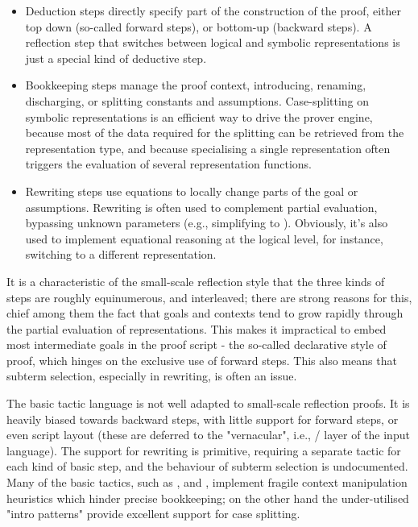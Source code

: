 \begin{itemize}
\item Deduction steps directly specify part of the construction of
the proof, either top down (so-called forward steps), or bottom-up
(backward steps). A reflection step that switches between logical and
symbolic representations is just a special kind of deductive step.
\item
Bookkeeping steps manage the proof context, introducing, renaming,
discharging, or splitting constants and assumptions. Case-splitting on
symbolic representations is an efficient way to drive the prover
engine, because most of the data required for the splitting can be
retrieved from the representation type, and because specialising a
single representation often triggers the evaluation of several
representation functions.
\item Rewriting steps use equations to locally
change parts of the goal or assumptions.  Rewriting is often used to
complement partial evaluation, bypassing unknown parameters (e.g.,
simplifying  to ). Obviously, it's also used to
implement equational reasoning at the logical level, for instance,
switching to a different representation.
\end{itemize}

It is a characteristic of the
small-scale reflection style that the three kinds of steps are roughly
equinumerous, and interleaved; there are strong reasons for this,
chief among them the fact that goals and contexts tend to grow rapidly
through the partial evaluation of representations.  This makes it
impractical to embed most intermediate goals in the proof script - the
so-called declarative style of proof, which hinges on the exclusive
use of forward steps. This also means that subterm selection,
especially in rewriting, is often an issue.

The basic \Coq{} tactic language is not well adapted to small-scale
reflection proofs. It is heavily biased towards backward steps, with
little support for forward steps, or even script layout (these are
deferred to the "vernacular", i.e., / layer of
the input language). The support for rewriting is primitive, requiring
a separate tactic for each kind of basic step, and the behaviour of
subterm selection is undocumented. Many of the basic tactics, such as
,  and , implement fragile context
manipulation heuristics which hinder precise bookkeeping; on the other
hand the under-utilised "intro patterns" provide excellent support for
case splitting.

